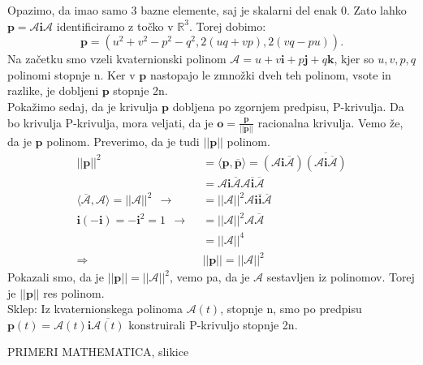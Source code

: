 \documentclass[mat1]{fmfdelo}
\newcommand{\R}{\mathbb R}
\newcommand{\ii}{\boldsymbol i}
\newcommand{\jj}{\boldsymbol j}
\newcommand{\kk}{\boldsymbol k}
\newcommand{\pp}{\boldsymbol p}
\newcommand{\A}{\mathcal A}
\begin{document}
Opazimo, da imao samo 3 bazne elemente, saj je skalarni del enak 0. Zato lahko $\pp = \A\ii\A$ identificiramo z točko v $\R^3$. Torej dobimo:
\begin{equation*}
\pp = (u^2+v^2-p^2-q^2, 2(uq+vp),2(vq-pu)).
\end{equation*}
Na začetku smo vzeli kvaternionski polinom $\A=u+v\ii+p\jj+q\kk$, kjer so $u,v,p,q$ polinomi stopnje n. Ker v $\pp$ nastopajo le zmnožki dveh teh polinom, vsote in razlike, je dobljeni $\pp$ stopnje 2n.\\
Pokažimo sedaj, da je krivulja $\pp$ dobljena po zgornjem predpisu, P-krivulja. Da bo krivulja P-krivulja, mora veljati, da je $\boldsymbol{o} = \frac{\pp}{||\pp||}$ racionalna krivulja. Vemo že, da je $\pp$ polinom. Preverimo, da je tudi $||\pp||$ polinom.
\begin{equation*}
\begin{split}
||\pp||^2 &= \langle \pp,\overline{\pp}\rangle = (\A\ii\overline{\A})\overline{(\A\ii\overline{\A})} \\
&= \A\ii\overline{\A}\A\overline{\ii} \overline{\A} \\
\langle \overline{\A}, \A \rangle = ||\A||^2 ~~ \longrightarrow ~~& = ||\A||^2 \A \ii \overline{\ii} \overline{\A} \\
\ii(-\ii) = -\ii^2 = 1 ~~ \longrightarrow ~~ & = ||\A||^2 \A \overline{\A} \\
&=||\A||^4 \\
\Longrightarrow ~~~~ & ||\pp|| = ||\A||^2
\end{split}
\end{equation*}
Pokazali smo, da je $||\pp|| = ||\A||^2$, vemo pa, da je $\A$ sestavljen iz polinomov. Torej je $||\pp||$ res polinom.\\

Sklep: Iz kvaternionskega polinoma $\A(t)$, stopnje n, smo po predpisu\\ $\pp(t) = \A(t)\ii\overline{\A(t)}$ konstruirali P-krivuljo stopnje 2n. 

PRIMERI MATHEMATICA, slikice
\end{document}
